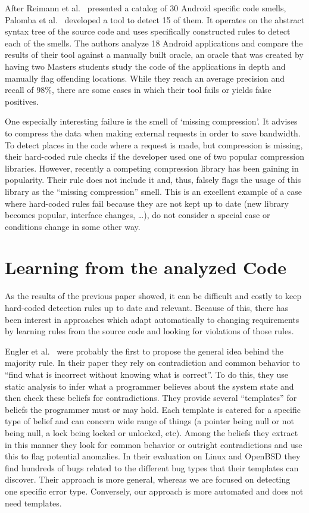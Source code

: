 After Reimann et al.~\cite{reimann2014tool} presented a catalog of 30 Android specific code smells, Palomba et al.~\cite{palomba2017lightweight} developed a tool to detect 15 of them.
It operates on the abstract syntax tree of the source code and uses specifically constructed rules to detect each of the smells.
The authors analyze 18 Android applications and compare the results of their tool against a manually built oracle,
an oracle that was created by having two Masters students study the code of the applications in depth and manually flag offending locations.
While they reach an average precision and recall of 98\%, there are some cases in which their tool fails or yields false positives.

One especially interesting failure is the smell of `missing compression'.
It advises to compress the data when making external requests in order to save bandwidth.
To detect places in the code where a request is made, but compression is missing, their hard-coded rule checks if the developer used one of two popular compression libraries.
However, recently a competing compression library has been gaining in popularity.
Their rule does not include it and, thus, falsely flags the usage of this library as the ``missing compression'' smell.
This is an excellent example of a case where hard-coded rules fail because they are not kept up to date (new library becomes popular, interface changes, \ldots), do not consider a special case or conditions change in some other way.

\section{Learning from the analyzed Code}

As the results of the previous paper showed, it can be difficult and costly to keep hard-coded detection rules up to date and relevant.
Because of this, there has been interest in approaches which adapt automatically to changing requirements by learning rules from the source code and looking for violations of those rules.

Engler et al.~\cite{engler2001bugs} were probably the first to propose the general idea behind the majority rule.
In their paper they rely on contradiction and common behavior to ``find what is incorrect without knowing what is correct''.
To do this, they use static analysis to infer what a programmer believes about the system state and then check these beliefs for contradictions.
They provide several ``templates'' for beliefs the programmer must or may hold.
Each template is catered for a specific type of belief and can concern wide range of things (a pointer being null or not being null, a lock being locked or unlocked, etc).
Among the beliefs they extract in this manner they look for common behavior or outright contradictions and use this to flag potential anomalies.
In their evaluation on Linux and OpenBSD they find hundreds of bugs related to the different bug types that their templates can discover.
Their approach is more general, whereas we are focused on detecting one specific error type.
Conversely, our approach is more automated and does not need templates.

